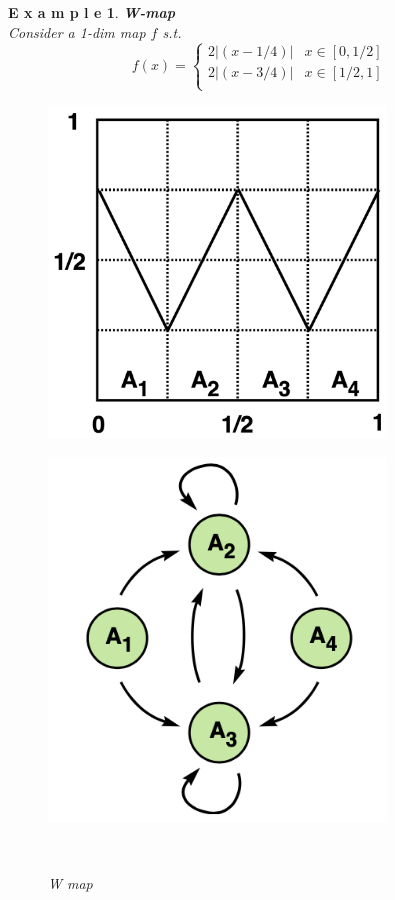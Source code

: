 \documentclass[12pt]{article}
\theoremstyle{plain}
\newtheorem{example}{\textbf{E x a m p l e}}[section]
\begin{document}
\begin{example}\textbf{W-map}
\\\noindent Consider a 1-dim map $f$ s.t.
$$
f(x) = \left\{
\begin{array}{ll}
2|(x - 1/4)| & x \in [0, 1/2] \\
2|(x - 3/4)| & x \in [1/2, 1] \\
\end{array}
\right.
$$

\newpage
\begin{figure}[H]
\begin{minipage}[c][0.3\width]{
   0.3\textwidth}
   \centering
   \includegraphics[width=0.8\textwidth]{figure/section7/W-map-intro.png}\\
\end{minipage}
\begin{minipage}[c][0.3\width]{
   0.3\textwidth}
   \centering
   \includegraphics[width=0.8\textwidth]{figure/section7/W-map-tran.png}
\end{minipage}
\\[4ex]\caption{W map}
\end{figure}


\end{example}
\end{document}

